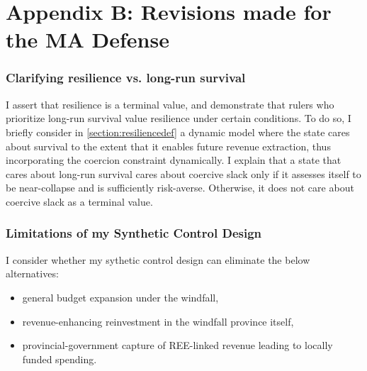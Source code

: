 \documentclass[12pt]{article}
\begin{document}
\section{Appendix B: Revisions made for the MA Defense}

\subsubsection{Clarifying resilience vs. long-run survival}

I assert that resilience is a terminal value, and demonstrate that rulers who prioritize long-run survival value resilience under certain conditions. To do so, I briefly consider in \ref{section:resiliencedef} a dynamic model where the state cares about survival to the extent that it enables future revenue extraction, thus incorporating the coercion constraint dynamically. I explain that a state that cares about long-run survival cares about coercive slack only if it assesses itself to be near-collapse and is sufficiently risk-averse. Otherwise, it does not care about coercive slack as a terminal value.

\subsubsection{Limitations of my Synthetic Control Design}

I consider whether my sythetic control design can eliminate the below alternatives:
\begin{itemize}
    \item general budget expansion under the windfall,
    \item revenue-enhancing reinvestment in the windfall province itself,
    \item provincial-government capture of REE-linked revenue leading to locally funded spending.
\end{itemize}
\end{document}
